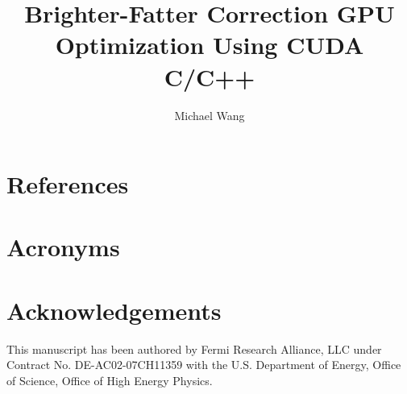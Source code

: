 \documentclass[DM,authoryear,toc]{lsstdoc}
\title{Brighter-Fatter Correction GPU Optimization Using CUDA C/C++}
\author{%
Michael Wang
}
\date{\vcsDate}
\begin{document}
\maketitle


\appendix
\section{References} \label{sec:bib}
\renewcommand{\refname}{} %


\section{Acronyms} \label{sec:acronyms}


\section{Acknowledgements} \label{sec:acknowledgement}

This manuscript has been authored by Fermi Research Alliance, LLC under Contract No. DE-AC02-07CH11359 with the U.S. Department of Energy, Office of Science, Office of High Energy Physics.
\end{document}

